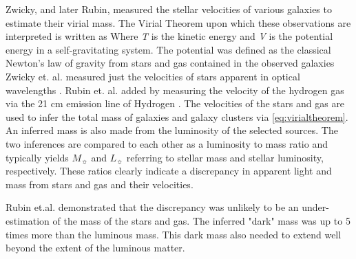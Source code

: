 Zwicky, and later Rubin, measured the stellar velocities of various galaxies to estimate their virial mass.
The Virial Theorem upon which these observations are interpreted is written as \virialtheorem
Where \textit{T} is the kinetic energy and \textit{V} is the potential energy in a self-gravitating system.
The potential was defined as the classical Newton's law of gravity from stars and gas contained in the observed galaxies \newtongravity
Zwicky et. al. measured just the velocities of stars apparent in optical wavelengths \cite{Zwicky:1933}.
Rubin et. al. added by measuring the velocity of the hydrogen gas via the 21 cm emission line of Hydrogen \cite{Rubin:1978}.
The velocities of the stars and gas are used to infer the total mass of galaxies and galaxy clusters via \cref{eq:virialtheorem}.
An inferred mass is also made from the luminosity of the selected sources.
The two inferences are compared to each other as a luminosity to mass ratio and typically yields \cite{Greene:cosmology_dm}\masslightratio
$M_{\sun}$ and $L_{\sun}$ referring to stellar mass and stellar luminosity, respectively.
These ratios clearly indicate a discrepancy in apparent light and mass from stars and gas and their velocities.

Rubin et.al. \cite{Rubin:1978} demonstrated that the discrepancy was unlikely to be an under-estimation of the mass of the stars and gas.
The inferred "dark" mass was up to 5 times more than the luminous mass.
This dark mass also needed to extend well beyond the extent of the luminous matter.

\begin{figure}[h]
\end{figure}


